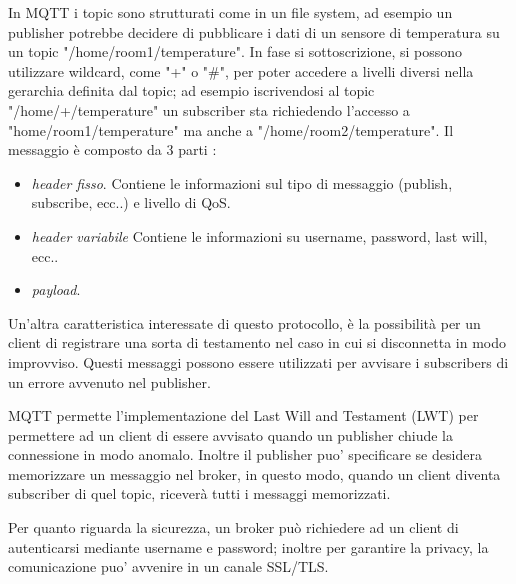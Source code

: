 In MQTT i topic sono strutturati come in un file system, ad esempio un publisher potrebbe decidere di pubblicare i dati di un sensore di temperatura su un topic "/home/room1/temperature". In fase si sottoscrizione, si possono utilizzare wildcard, come "+" o "\#", per poter accedere a livelli diversi nella gerarchia definita dal topic; ad esempio iscrivendosi al topic "/home/+/temperature" un subscriber sta richiedendo l'accesso a "home/room1/temperature" ma anche a "/home/room2/temperature".
Il messaggio è composto da 3 parti \cite{MqttStandard}:
\begin{itemize}
    \item \emph{header fisso}. Contiene le informazioni sul tipo di messaggio (publish, subscribe, ecc..) e livello di QoS.
    \item \emph{header variabile} Contiene le informazioni su username, password, last will, ecc.. \cite{MqttIBM}
    \item \emph{payload}.
\end{itemize}

Un'altra caratteristica interessate di questo protocollo, è la possibilità per un client di registrare una sorta di testamento nel caso in cui si disconnetta in modo improvviso. Questi messaggi possono essere utilizzati per avvisare i subscribers di un errore avvenuto nel publisher.

MQTT permette l'implementazione del Last Will and Testament (LWT) per permettere ad un client di essere avvisato quando un publisher chiude la connessione in modo anomalo. Inoltre il publisher puo' specificare se desidera memorizzare un messaggio nel broker, in questo modo, quando un client diventa subscriber di quel topic, riceverà tutti i messaggi memorizzati.

Per quanto riguarda la sicurezza, un broker può richiedere ad un client di autenticarsi mediante username e password; inoltre per garantire la privacy, la comunicazione puo' avvenire in un canale SSL/TLS. 

\newpage
